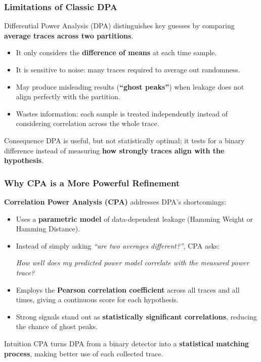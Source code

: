\begin{frame}
    \frametitle{Limitations of Classic DPA}
    Differential Power Analysis (DPA) distinguishes key guesses 
    by comparing \textbf{average traces across two partitions}.
    
    \begin{itemize}
        \item It only considers the \textbf{difference of means} at each time sample.
        \item It is sensitive to noise: many traces required to average out randomness.
        \item May produce misleading results (\textbf{``ghost peaks''}) when leakage does not align perfectly with the partition.
        \item Wastes information: each sample is treated independently instead of considering correlation across the whole trace.
    \end{itemize}

    \begin{block}{Consequence}
        DPA is useful, but not statistically optimal; it tests for a binary difference instead of measuring \textbf{how strongly traces align with the hypothesis}.
    \end{block}
\end{frame}


\begin{frame}
    \frametitle{Why CPA is a More Powerful Refinement}

    \textbf{Correlation Power Analysis (CPA)} addresses DPA’s shortcomings:

    \begin{itemize}
        \item Uses a \textbf{parametric model} of data-dependent leakage 
              (Hamming Weight or Hamming Distance).
        \item Instead of simply asking \textit{“are two averages different?”}, 
              CPA asks: \newline
            
                  \textit{How well does my predicted power model                 
                  correlate with the measured power trace?}
              
        \item Employs the \textbf{Pearson correlation coefficient} across all traces and all times, 
              giving a continuous score for each hypothesis.
        \item Strong signals stand out as \textbf{statistically significant correlations}, 
              reducing the chance of ghost peaks.
    \end{itemize}

    \begin{block}{Intuition}
        CPA turns DPA from a binary detector into a \textbf{statistical matching process}, 
        making better use of each collected trace.
    \end{block}
\end{frame}

